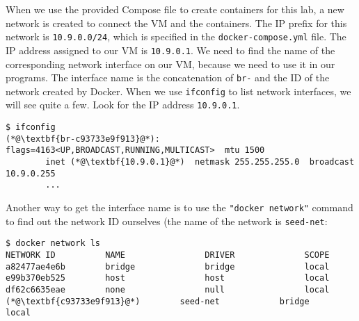 When we use the provided Compose file to create
containers for this lab, a new network is created
to connect the VM and the containers. The
IP prefix for this network is \texttt{10.9.0.0/24},
which is specified in the \texttt{docker-compose.yml}
file. The IP address assigned to our VM is
\texttt{10.9.0.1}. We need to find the name of
the corresponding network interface on our VM, because we
need to use it in our programs.
The interface name is the concatenation of \texttt{br-}
and the ID of the network created by Docker.
When we use \texttt{ifconfig} to list network interfaces,
we will see quite a few. Look for the IP address
\texttt{10.9.0.1}.


\begin{lstlisting}
$ ifconfig
(*@\textbf{br-c93733e9f913}@*): flags=4163<UP,BROADCAST,RUNNING,MULTICAST>  mtu 1500
        inet (*@\textbf{10.9.0.1}@*)  netmask 255.255.255.0  broadcast 10.9.0.255
        ...
\end{lstlisting}


Another way to get the interface name is to use the \texttt{"docker network"} command to
find out the network ID ourselves (the name of the network is \texttt{seed-net}:

\begin{lstlisting}
$ docker network ls
NETWORK ID          NAME                DRIVER              SCOPE
a82477ae4e6b        bridge              bridge              local
e99b370eb525        host                host                local
df62c6635eae        none                null                local
(*@\textbf{c93733e9f913}@*)        seed-net            bridge              local
\end{lstlisting}


